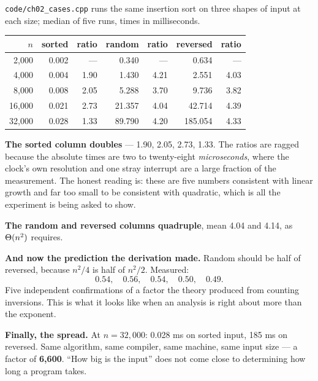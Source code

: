 \begin{worked}
\texttt{code/ch02\_cases.cpp} runs the same insertion sort on three shapes of
input at each size; median of five runs, times in milliseconds.

\begin{center}
\begin{tabular}{@{}rrrrrrr@{}}
\toprule
\rowcolor{primary!15}
$n$ & sorted & ratio & random & ratio & reversed & ratio \\
\midrule
 2{,}000 & 0.002 & ---  &  0.340 & ---  &   0.634 & ---  \\
 4{,}000 & 0.004 & 1.90 &  1.430 & 4.21 &   2.551 & 4.03 \\
 8{,}000 & 0.008 & 2.05 &  5.288 & 3.70 &   9.736 & 3.82 \\
16{,}000 & 0.021 & 2.73 & 21.357 & 4.04 &  42.714 & 4.39 \\
32{,}000 & 0.028 & 1.33 & 89.790 & 4.20 & 185.054 & 4.33 \\
\bottomrule
\end{tabular}
\end{center}

\smallskip
\textbf{The sorted column doubles} --- 1.90, 2.05, 2.73, 1.33. The ratios are
ragged because the absolute times are two to twenty-eight \emph{microseconds},
where the clock's own resolution and one stray interrupt are a large fraction
of the measurement. The honest reading is: these are five numbers consistent
with linear growth and far too small to be consistent with quadratic, which is
all the experiment is being asked to show.

\smallskip
\textbf{The random and reversed columns quadruple}, mean 4.04 and 4.14, as
$\Theta(n^{2})$ requires.

\smallskip
\textbf{And now the prediction the derivation made.} Random should be half of
reversed, because $n^{2}/4$ is half of $n^{2}/2$. Measured:
\[ 0.54,\quad 0.56,\quad 0.54,\quad 0.50,\quad 0.49. \]
Five independent confirmations of a factor the theory produced from counting
inversions. This is what it looks like when an analysis is right about more
than the exponent.

\smallskip
\textbf{Finally, the spread.} At $n = 32{,}000$: 0.028 ms on sorted input,
185 ms on reversed. Same algorithm, same compiler, same machine, same input
size --- a factor of \textbf{6{,}600}. ``How big is the input'' does not come
close to determining how long a program takes.
\end{worked}

